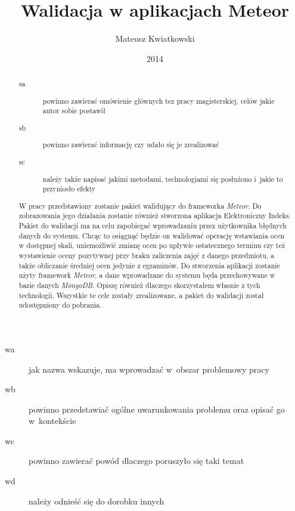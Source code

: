 \documentclass[brudnopis]{xmgr}
\author   {Mateusz Kwiatkowski}
\title    {Walidacja w aplikacjach Meteor}
\date     {2014}
\begin{document}
\begin{abstract}

\begin{description}
\item[sa] \textcolor{sa}{powinno zawierać omówienie głównych 
tez pracy magisterskiej, celów jakie autor sobie postawił} 
\item[sb] \textcolor{sb}{powinno zawierać informację czy udało 
  się je zrealizować}
\item[sc] \textcolor{sc}{należy także napisać jakimi metodami,
  technologiami się posłużono i~jakie to przyniosło efekty}
\end{description}

\textcolor{sa}{W pracy przedstawiony zostanie pakiet walidujący do frameworka \textit{Meteor}. Do zobrazowania
jego działania zostanie również stworzona aplikacja Elektroniczny Indeks. Pakiet do walidacji ma na celu zapobiegać
wprowadzaniu przez użytkownika błędnych danych do systemu. Chcąc to osiągnąć będzie
on walidować operację wstawiania ocen w dostępnej skali, uniemożliwić zmianę ocen po
upływie ostatecznego terminu czy też wystawienie oceny pozytywnej przy braku zaliczenia zajęć
z danego przedmiotu, a także obliczanie średniej ocen jedynie z egzaminów.} \textcolor{sc}{Do stworzenia aplikacji zostanie użyty
framework \textit{Meteor}, a dane wprowadzane do systemu będa przechowywane w bazie danych \textit{MongoDB}. Opiszę również
dlaczego skorzystałem własnie z tych technologii.}
\textcolor{sb}{Wszystkie te cele zostały zrealizowane, a pakiet do walidacji został udostępniony do pobrania.}

\end{abstract}

\maketitle
%
\introduction

\begin{description}
\item[wa] \textcolor{wa}{jak nazwa wskazuje, ma wprowadzać 
  w~obszar problemowy pracy}
\item[wb] \textcolor{wb}{powinno przedstawiać ogólne 
  uwarunkowania problemu oraz opisać go w~kontekście}
\item[wc] \textcolor{wc}{powinno zawierać powód dlaczego 
  poruszyło się taki temat}
\item[wd] \textcolor{wd}{należy odnieść się do dorobku innych}
\end{description}
\end{document}
